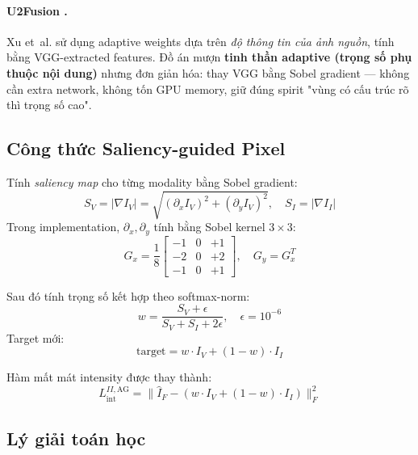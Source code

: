 \paragraph{U2Fusion \cite{xu2020u2fusion}.}
Xu et~al. sử dụng adaptive weights dựa trên \emph{độ thông tin của ảnh nguồn}, tính bằng VGG-extracted features. Đồ án mượn \textbf{tinh thần adaptive (trọng số phụ thuộc nội dung)} nhưng đơn giản hóa: thay VGG bằng Sobel gradient --- không cần extra network, không tốn GPU memory, giữ đúng spirit "vùng có cấu trúc rõ thì trọng số cao".

\subsection{Công thức Saliency-guided Pixel}

Tính \emph{saliency map} cho từng modality bằng Sobel gradient:
\begin{equation}
S_V = |\nabla I_V| = \sqrt{(\partial_x I_V)^2 + (\partial_y I_V)^2}, \quad S_I = |\nabla I_I|
\end{equation}
Trong implementation, $\partial_x, \partial_y$ tính bằng Sobel kernel $3 \times 3$:
\begin{equation*}
G_x = \frac{1}{8}\begin{bmatrix} -1 & 0 & +1 \\ -2 & 0 & +2 \\ -1 & 0 & +1 \end{bmatrix}, \quad G_y = G_x^T
\end{equation*}

Sau đó tính trọng số kết hợp theo softmax-norm:
\begin{equation}
w = \frac{S_V + \epsilon}{S_V + S_I + 2\epsilon}, \quad \epsilon = 10^{-6}
\label{eq:saliency-weight}
\end{equation}
Target mới:
\begin{equation}
\mathrm{target} = w \cdot I_V + (1 - w) \cdot I_I
\label{eq:saliency-target}
\end{equation}

Hàm mất mát intensity được thay thành:
\begin{equation}
L_{\mathrm{int}}^{II,\mathrm{AG}} = \|\hat{I}_F - (w \cdot I_V + (1-w) \cdot I_I)\|_F^2
\label{eq:saliency-loss}
\end{equation}

\subsection{Lý giải toán học}

